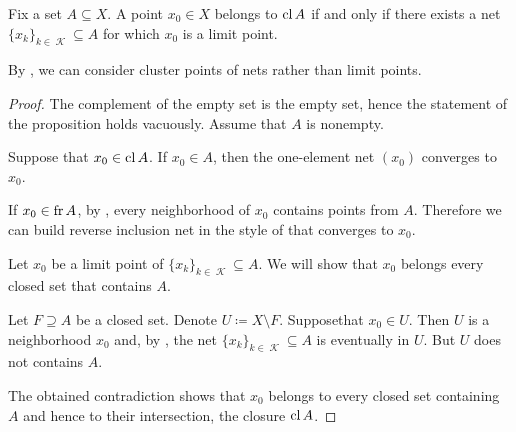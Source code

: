 \begin{proposition}\label{thm:limit_point_iff_in_closure}
  Fix a set \( A \subseteq X \). A point \( x_0 \in X \) belongs to \( \operatorname{cl}{A} \) if and only if there exists a net \( \{ x_k \}_{k \in \mscrK} \subseteq A \) for which \( x_0 \) is a limit point.

  By , we can consider cluster points of nets rather than limit points.
\end{proposition}
\begin{proof}
  The complement of the empty set is the empty set, hence the statement of the proposition holds vacuously. Assume that \( A \) is nonempty.

  \SufficiencySubProof Suppose that \( x_0 \in \operatorname{cl}{A} \). If \( x_0 \in A \), then the one-element net \( (x_0) \) converges to \( x_0 \).

  If \( x_0 \in \operatorname{fr}{A} \), by , every neighborhood of \( x_0 \) contains points from \( A \). Therefore we can build reverse inclusion net in the style of  that converges to \( x_0 \).

  \NecessitySubProof Let \( x_0 \) be a limit point of \( \{ x_k \}_{k \in \mscrK} \subseteq A \). We will show that \( x_0 \) belongs every closed set that contains \( A \).

  Let \( F \supseteq A \) be a closed set. Denote \( U \coloneqq X \setminus F \). Suppose\LEM that \( x_0 \in U \). Then \( U \) is a neighborhood \( x_0 \) and, by , the net \( \{ x_k \}_{k \in \mscrK} \subseteq A \) is eventually in \( U \). But \( U \) does not contains \( A \).

  The obtained contradiction shows that \( x_0 \) belongs to every closed set containing \( A \) and hence to their intersection, the closure \( \operatorname{cl} A \).
\end{proof}

